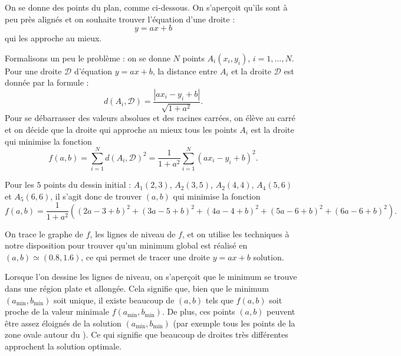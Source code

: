 \documentclass[11pt,class=report,crop=false]{standalone}
\begin{document}
\begin{exemple}
On se donne des points du plan, comme ci-dessous. On s'aperçoit qu'ils sont à peu près alignés et on souhaite trouver l'équation d'une droite :
$$y= a x + b$$ 
qui les approche au mieux.


   

Formalisons un peu le problème : on se donne $N$ points $A_i(x_i,y_i)$, $i=1,\ldots,N$. Pour une droite $\mathcal{D}$ d'équation $y=ax+b$, la distance entre $A_i$ et la droite $\mathcal{D}$ est donnée par la formule :
$$d(A_i,\mathcal{D}) = \frac{|ax_i-y_i+b|}{\sqrt{1+a^2}}.$$
Pour se débarrasser des valeurs absolues et des racines carrées, on élève au carré et on décide que la droite qui approche au mieux tous les points $A_i$ est la droite qui minimise la fonction 
$$f(a,b) = \sum_{i=1}^{N} d(A_i,\mathcal{D})^2 = 
\frac{1}{1+a^2} \sum_{i=1}^{N}  (ax_i-y_i+b)^2.$$

Pour les $5$ points du dessin initial : $A_1(2,3)$, $A_2(3,5)$, 
 $A_2(4,4)$, $A_4(5,6)$ et $A_5(6,6)$, il s'agit donc de trouver $(a,b)$ qui minimise la fonction 
 $$f(a,b) = \frac{1}{1+a^2} \left( 
 (2a-3+b)^2 + (3a-5+b)^2 + (4a-4+b)^2 + (5a-6+b)^2 + (6a-6+b)^2 \right).$$

 
On trace le graphe de $f$, les lignes de niveau de $f$, et on utilise les techniques à notre disposition pour trouver qu'un minimum global est réalisé en $(a,b) \simeq (0.8,1.6)$, ce qui permet de tracer une droite $y=ax+b$ solution.
 

Lorsque l'on dessine les lignes de niveau, on s'aperçoit que le minimum se trouve dans une région plate et allongée. Cela signifie que, bien que le minimum $(a_{\min},b_{\min})$ soit unique, il existe beaucoup de $(a,b)$ tels que $f(a,b)$ soit proche de la valeur minimale $f(a_{\min},b_{\min})$. De plus, ces points $(a,b)$ peuvent être assez éloignés de la solution $(a_{\min},b_{\min})$ (par exemple tous les points de la zone ovale autour du ). Ce qui signifie que beaucoup de droites très différentes approchent la solution optimale.



\end{exemple}
\end{document}
